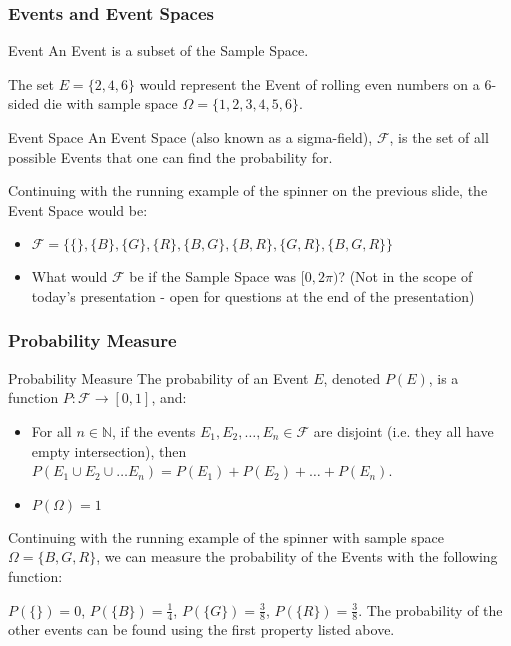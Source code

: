 \documentclass{beamer}
\begin{document}
\begin{frame}
  \frametitle{Events and Event Spaces}
  \begin{block}{Event}
    An Event is a subset of the Sample Space.
  \end{block}
  \begin{example}
  The set $E = \{2,4,6\}$ would represent the Event of rolling even numbers on a 6-sided die with sample space $\Omega = \{1,2,3,4,5,6\}$.
  \end{example}
\end{frame}
\begin{frame}
  \begin{block}{Event Space}
    An Event Space (also known as a sigma-field), $\mathscr{F}$, is the set of all possible Events that one can find the probability for.
  \end{block}
  \begin{example}
    Continuing with the running example of the spinner on the previous slide, the Event Space would be:

    \begin{itemize}
      \item $\mathscr{F} = \{\{\}, \{B\}, \{G\}, \{R\}, \{B,G\}, \{B,R\}, \{G, R\}, \{B, G, R\}\}$
    \pause

      \item What would $\mathscr{F}$ be if the Sample Space was $[0,2\pi)$? (Not in the scope of today's presentation - open for questions at the end of the presentation)
    \end{itemize}
  \end{example}
\end{frame}
\begin{frame}
  \frametitle{Probability Measure}
  \begin{block}{Probability Measure}
    The probability of an Event $E$, denoted $P(E)$, is a function $P: \mathscr{F} \rightarrow [0,1]$, and:
    \begin{itemize}
      \item For all $n \in \mathbb{N}$, if the events $E_1, E_2, \ldots, E_n \in \mathscr{F}$ are disjoint (i.e. they all have empty intersection), then $P(E_1 \cup E_2 \cup \ldots E_n) = P(E_1) + P(E_2) + \ldots + P(E_n)$.
      \item $P(\Omega) = 1$
    \end{itemize}
  \end{block}
  \begin{example}
    Continuing with the running example of the spinner with sample space $\Omega = \{B, G, R\}$, we can measure the probability of the Events with the following function:

    $P(\{\}) = 0$, $P(\{B\}) = \frac{1}{4}$, $P(\{G\}) = \frac{3}{8}$, $P(\{R\}) = \frac{3}{8}$. The probability of the other events can be found using the first property listed above.
  \end{example}
\end{frame}
\end{document}
